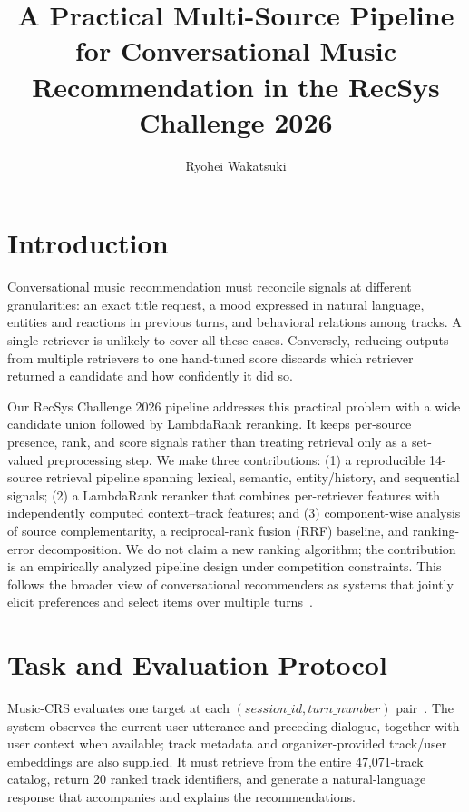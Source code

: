 \documentclass[sigconf]{acmart}
\title[Multi-Source Conversational Music Recommendation]{%
  A Practical Multi-Source Pipeline for Conversational Music Recommendation
  in the RecSys Challenge 2026}
\author{Ryohei Wakatsuki}
\affiliation{%
  \institution{Independent Researcher}
  \city{Tokyo}
  \country{Japan}}
\begin{document}
\maketitle

\section{Introduction}
Conversational music recommendation must reconcile signals at different
granularities: an exact title request, a mood expressed in natural language,
entities and reactions in previous turns, and behavioral relations among
tracks.  A single retriever is unlikely to cover all these cases.  Conversely,
reducing outputs from multiple retrievers to one hand-tuned score discards
which retriever returned a candidate and how confidently it did so.

Our RecSys Challenge 2026 pipeline addresses this practical problem with a wide
candidate union followed by LambdaRank reranking.  It keeps per-source
presence, rank, and score signals rather than treating retrieval only as a
set-valued preprocessing step.  We make three contributions: (1) a reproducible 14-source retrieval
pipeline spanning lexical, semantic, entity/history, and sequential signals;
(2) a LambdaRank reranker that combines per-retriever features with independently
computed context--track features; and (3) component-wise analysis of source
complementarity, a reciprocal-rank fusion (RRF) baseline, and ranking-error
decomposition.  We do not
claim a new ranking algorithm; the contribution is an empirically analyzed
pipeline design under competition constraints.  This follows the broader view
of conversational recommenders as systems that jointly elicit preferences and
select items over multiple turns~\cite{jannach2021survey}.

\section{Task and Evaluation Protocol}
Music-CRS evaluates one target at each $(\mathit{session\_id},
\mathit{turn\_number})$ pair~\cite{challenge2026}.  The system observes the
current user utterance and preceding dialogue, together with user context when
available; track metadata and organizer-provided track/user embeddings are
also supplied.  It must retrieve from the entire 47,071-track catalog, return
20 ranked track identifiers, and generate a natural-language response that
accompanies and explains the recommendations.
\end{document}
